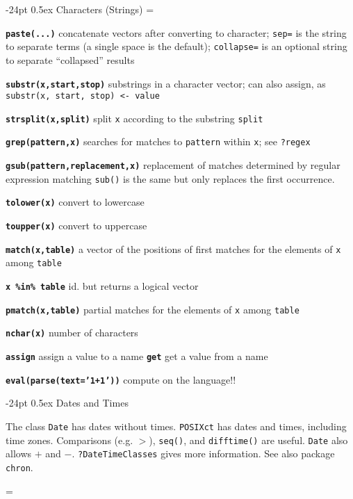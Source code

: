 \documentclass[10pt,landscape]{article}
\makeatletter
\renewcommand\section{\@startsection{section}{1}{0mm}%
                                     {-24pt}%
                                     {0.5ex}%
                                {\color{blue}\normalfont\large\bfseries}}
\newcommand{\code}{\texttt}
\newcommand{\bcode}[1]{\texttt{\textbf{#1}}}
\makeatother
\begin{document}
\begin{multicols*}{3}
\section{Characters (Strings)}
\everypar={\hangindent=9mm}

\bcode{paste(...)} concatenate vectors after converting to character;
\code{sep=} is the string to separate terms (a single space is the default);
\code{collapse=} is an optional string to separate ``collapsed'' results

\bcode{substr(x,start,stop)} substrings in a character vector; can also assign, as \code{substr(x, start, stop) <- value}

\bcode{strsplit(x,split)} split \code{x} according to the substring \code{split}

\bcode{grep(pattern,x)} searches for matches to \code{pattern}
     within \code{x}; see \code{?regex}

\bcode{gsub(pattern,replacement,x)} replacement of matches determined by
regular expression matching \code{sub()} is the same but only
replaces the first occurrence.

\bcode{tolower(x)} convert to lowercase

\bcode{toupper(x)} convert to uppercase

\bcode{match(x,table)} a vector of the positions of first matches for the elements of \code{x} among \code{table}

\bcode{x \%in\% table} id. but returns a logical vector

\bcode{pmatch(x,table)} partial matches for the elements of \code{x} among \code{table}

\bcode{nchar(x)} number of characters

\bcode{assign} assign a value to a name
\bcode{get} get a value from a name

\bcode{eval(parse(text='1+1'))} compute on the language!!

\section{\color{blue}Dates and Times}

The class \code{Date} has dates without times.  \code{POSIXct} has
dates and times, including time zones. Comparisons (e.g. $>$),
\code{seq()}, and \code{difftime()} are useful. \code{Date} also allows
$+$ and $-$. \code{?DateTimeClasses} gives more information. See also package
\code{chron}.

\everypar={\hangindent=9mm}


\end{multicols*}
\end{document}
